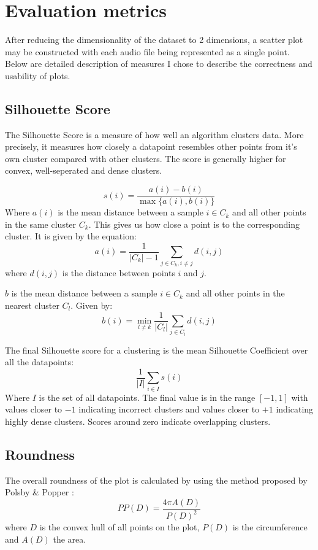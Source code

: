 \documentclass[a4paper, 12pt, twoside]{report}
\begin{document}
\section{Evaluation metrics}
\label{sec:org078e27c}

After reducing the dimensionality of the dataset to 2 dimensions, a scatter plot may be constructed with each audio file being represented as a single point. Below are detailed description of measures I chose to describe the correctness and usability of plots.
\subsection{Silhouette Score}
\label{sec:org8d91088}
The Silhouette Score is a measure of how well an algorithm clusters data. More precisely, it measures how closely a datapoint resembles other points from it's own cluster compared with other clusters. The score is generally higher for convex, well-seperated and dense clusters.

\[s(i) = \frac{a(i) - b(i)}{\max\{a(i), b(i)\}} \]
Where $a(i)$ is the mean distance between a sample \(i \in C_{k}\) and all other points in the same cluster \(C_{k}\). This gives us how close a point is to the corresponding cluster. It is given by the equation:
\[ a(i) = \frac{1}{|C_{k}| - 1} \sum_{j \in C_{k}, i \neq j}{d(i,j)}\]
where \(d(i,j)\) is the distance between points \(i\) and \(j\).

\(b\) is the mean distance between a sample \(i \in C_{k}\) and all other points in the nearest cluster \(C_{l}\). Given by:
\[ b(i) = \min_{l \neq k}{\frac{1}{|C_{l}|} \sum_{j \in C_{l}}{d(i,j)}} \]

The final Silhouette score for a clustering is the mean Silhouette Coefficient over all the datapoints:
\[ \frac{1}{|I|}\sum_{i \in I}{s(i)} \]
Where \(I\) is the set of all datapoints. The final value is in the range \([-1, 1]\) with values closer to $-1$ indicating incorrect clusters and values closer to $+1$ indicating highly dense clusters. Scores around zero indicate overlapping clusters.

\subsection{Roundness}
\label{sec:org7b61201}

The overall roundness of the plot is calculated by using the method proposed by Polsby \& Popper \cite{popper}:
\[PP(D) = \frac{4 \pi A(D)}{P(D)^{2}} \]
where \(D\) is the convex hull of all points on the plot, \(P(D)\) is the circumference and \(A(D)\) the area.
\end{document}
